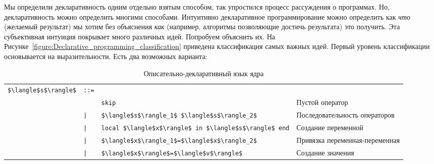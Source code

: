 Мы определили декларативность одним отдельно взятым способом, так упростился процесс рассуждения о программах. Но, декларативность можно определить многими способами. Интуитивно декларативное программирование можно определить как \emph{что} (желаемый результат) мы хотим без объяснения \emph{как} (например, алгоритмы позволяющие достичь результата) это получить. Эта субъективная интуиция покрывает много различных идей. Попробуем объяснить их. На Рисунке~\ref{figure:Declarative_programming_classification} приведена классификация самых важных идей. Первый уровень классификации основывается на выразительности. Есть два возможных варианта:

\begin{table}
  \begin{tabular}{|llll|}
    \hline
    \lstinline|$\langle$s$\rangle$| & \lstinline|::=| & & \\
    & & \lstinline|skip| & Пустой оператор \\
    & \lstinline!|! & \lstinline|$\langle$s$\rangle_1$ $\langle$s$\rangle_2$| & Последовательность операторов \\
    & \lstinline!|! & \lstinline|local $\langle$x$\rangle$ in $\langle$s$\rangle$ end| & Создание переменной \\
    & \lstinline!|! & \lstinline!$\langle$x$\rangle_1$=$\langle$x$\rangle_2$! & Привязка переменная-переменная \\
    & \lstinline!|! & \lstinline!$\langle$x$\rangle$=$\langle$v$\rangle$! & Создание значения \\
    \hline
  \end{tabular}
  \caption{Описательно-декларативный язык ядра}
  \label{table:descriptive_declarative_kernel}
\end{table}

